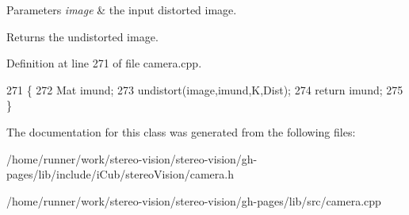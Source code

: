 \begin{DoxyParams}{Parameters}
{\em image} & the input distorted image. \\
\hline
\end{DoxyParams}
\begin{DoxyReturn}{Returns}
the undistorted image. 
\end{DoxyReturn}


Definition at line 271 of file camera.\+cpp.


\begin{DoxyCode}
271                                     \{
272     Mat imund;
273     undistort(image,imund,K,Dist);
274     \textcolor{keywordflow}{return} imund;
275 \}
\end{DoxyCode}


The documentation for this class was generated from the following files\+:\begin{DoxyCompactItemize}
\item 
/home/runner/work/stereo-\/vision/stereo-\/vision/gh-\/pages/lib/include/i\+Cub/stereo\+Vision/camera.\+h\item 
/home/runner/work/stereo-\/vision/stereo-\/vision/gh-\/pages/lib/src/camera.\+cpp\end{DoxyCompactItemize}
